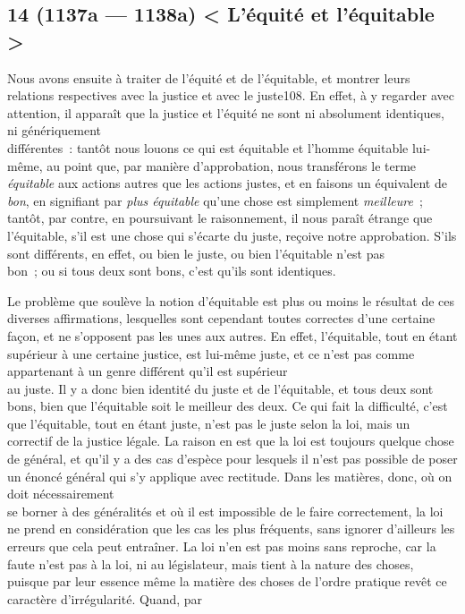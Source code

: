 \documentclass[french,twoside]{book} %
\begin{document}
\subsection[{14 (1137a — 1138a) < L’équité et l’équitable >}]{14 (1137a — 1138a) < L’équité et l’équitable >}
\noindent Nous avons ensuite à traiter de l’équité et de l’équitable, et montrer leurs relations respectives avec la justice et avec le juste108. En effet, à y regarder avec attention, il apparaît que la justice et l’équité ne sont ni absolument identiques, ni génériquement \\
différentes : tantôt nous louons ce qui est équitable et l’homme équitable lui-même, au point que, par manière  d’approbation, nous transférons le terme {\itshape équitable} aux actions autres que les actions justes, et en faisons un équivalent de {\itshape bon}, en signifiant par {\itshape plus équitable} qu’une chose est simplement {\itshape meilleure} ; tantôt, par contre, en poursuivant le raisonnement, il nous paraît étrange que l’équitable, s’il est une chose qui s’écarte du juste, reçoive notre approbation. S’ils sont différents, en effet, ou bien le juste, ou bien l’équitable n’est pas \\
bon ; ou si tous deux sont bons, c’est qu’ils sont identiques.\par
Le problème que soulève la notion d’équitable est plus ou moins le résultat de ces diverses affirmations, lesquelles sont cependant toutes correctes d’une certaine façon, et ne s’opposent pas les unes aux autres. En effet, l’équitable, tout en étant supérieur à une certaine justice, est lui-même juste, et ce n’est pas comme appartenant à un genre différent qu’il est supérieur \\
au juste. Il y a donc bien identité du juste et de l’équitable, et tous deux sont bons, bien que l’équitable soit le meilleur des deux. Ce qui fait la difficulté, c’est que l’équitable, tout en étant juste, n’est pas le juste selon la loi, mais un correctif de la justice légale. La raison en est que la loi est toujours quelque chose de général, et qu’il y a des cas d’espèce pour lesquels il n’est pas possible de poser un énoncé général qui s’y applique avec rectitude. Dans les matières, donc, où on doit nécessairement \\
se borner à des généralités et où il est impossible de le faire correctement, la loi ne prend en considération que les cas les plus fréquents, sans ignorer d’ailleurs les erreurs que cela peut entraîner. La loi n’en est pas moins sans reproche, car la faute n’est pas à la loi, ni au législateur, mais tient à la nature des choses, puisque par leur essence même la matière des choses de l’ordre pratique revêt ce caractère d’irrégularité. Quand, par \\
\end{document}
